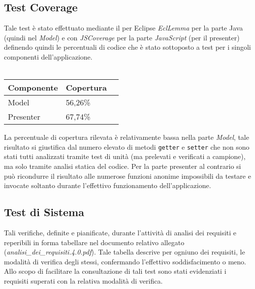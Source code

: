 \subsection{Test Coverage}
Tale test è stato effettuato mediante il \underline{} per Eclipse \textit{EclLemma} per la parte Java (quindi nel \textit{Model}) e con \textit{JSCoverage} per la parte \textit{JavaScript} (per il presenter) definendo quindi le percentuali di codice che è stato sottoposto a test per i singoli componenti dell'applicazione.\\\\

\begin{center}
\begin{longtable}{p{}ll}
\toprule Componente & Copertura\\
\midrule
Model & 56,26\%\\
Presenter & 67,74\% \\
\bottomrule
\end{longtable}
\end{center}

La percentuale di copertura rilevata è relativamente bassa nella parte \textit{Model}, tale risultato si giustifica dal numero elevato di metodi \texttt{getter} e \texttt{setter} che non sono stati tutti analizzati tramite test di unità (ma prelevati e verificati a campione), ma solo tramite analisi statica del codice. Per la parte presenter al contrario si può ricondurre il risultato alle numerose funzioni anonime impossibili da testare e invocate soltanto durante l'effettivo funzionamento dell'applicazione.

\subsection{Test di Sistema}
Tali verifiche, definite e pianificate, durante l'attività di analisi dei requisiti e reperibili in forma tabellare nel documento relativo allegato (\textit{analisi\_dei\_requisiti.4.0.pdf}).
Tale tabella descrive per ogniuno dei requisiti, le modalità di verifica degli stessi, confermando l'effettivo soddisfacimento o meno. 
Allo scopo di facilitare la consultazione di tali test sono stati evidenziati i requisiti superati con la relativa modalità di verifica.

